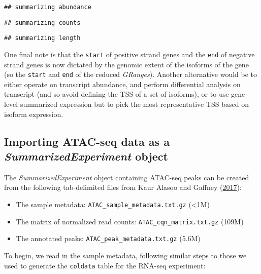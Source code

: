 \documentclass[
]{article}
\newenvironment{Shaded}{}{}
\newcommand{\DataTypeTok}[1]{\textcolor[rgb]{0.56,0.13,0.00}{#1}}
\newcommand{\KeywordTok}[1]{\textcolor[rgb]{0.00,0.44,0.13}{\textbf{#1}}}
\newcommand{\NormalTok}[1]{#1}
\newcommand{\OperatorTok}[1]{\textcolor[rgb]{0.40,0.40,0.40}{#1}}
\newcommand{\StringTok}[1]{\textcolor[rgb]{0.25,0.44,0.63}{#1}}
\providecommand{\tightlist}{%
  \setlength{\itemsep}{0pt}\setlength{\parskip}{0pt}}
\begin{document}
\begin{verbatim}
## summarizing abundance
\end{verbatim}

\begin{verbatim}
## summarizing counts
\end{verbatim}

\begin{verbatim}
## summarizing length
\end{verbatim}

One final note is that the \texttt{start} of positive strand genes and the \texttt{end} of
negative strand genes is now dictated by the genomic extent of the isoforms of
the gene (so the \texttt{start} and \texttt{end} of the reduced \emph{GRanges}). Another
alternative would be to either operate on transcript abundance, and perform
differential analysis on transcript (and so avoid defining the TSS of a set of
isoforms), or to use gene-level summarized expression but to pick the most
representative TSS based on isoform expression.

\hypertarget{atac}{%
\subsection{\texorpdfstring{Importing ATAC-seq data as a \emph{SummarizedExperiment} object}{Importing ATAC-seq data as a SummarizedExperiment object}}\label{atac}}

The \emph{SummarizedExperiment} object containing ATAC-seq peaks can be created from
the following tab-delimited files from Kaur Alasoo and Gaffney (\protect\hyperlink{ref-alasooZenodo}{2017}):

\begin{itemize}
\tightlist
\item
  The sample metadata: \texttt{ATAC\_sample\_metadata.txt.gz} (\textless1M)
\item
  The matrix of normalized read counts: \texttt{ATAC\_cqn\_matrix.txt.gz} (109M)
\item
  The annotated peaks: \texttt{ATAC\_peak\_metadata.txt.gz} (5.6M)
\end{itemize}

To begin, we read in the sample metadata, following similar steps to those we
used to generate the \texttt{coldata} table for the RNA-seq experiment:

\begin{Shaded}
\end{Shaded}
\end{document}
